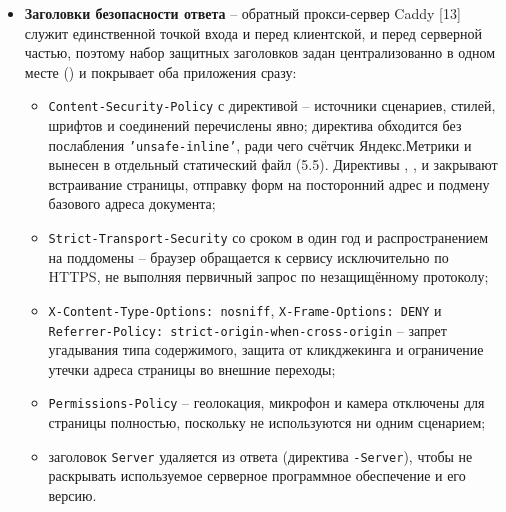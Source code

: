 \begin{itemize}
        обращаться к программному интерфейсу, задаётся явным списком в
        конфигурации сервера (механизм CORS) и не допускает произвольного
        происхождения запроса.
  \item \textbf{Заголовки безопасности ответа} -- обратный прокси-сервер
        Caddy [13] служит единственной точкой входа и перед клиентской, и
        перед серверной частью, поэтому набор защитных заголовков задан
        централизованно в одном месте () и покрывает
        оба приложения сразу:
        \begin{itemize}
          \item \texttt{Content-Security-Policy} с директивой
                 -- источники сценариев,
                стилей, шрифтов и соединений перечислены явно; директива
                 обходится без послабления
                \texttt{'unsafe-inline'}, ради чего счётчик
                Яндекс.Метрики и вынесен в отдельный статический файл
                (5.5). Директивы ,
                ,  и
                 закрывают встраивание
                страницы, отправку форм на посторонний адрес и подмену
                базового адреса документа;
          \item \texttt{Strict-Transport-Security} со сроком в один год и
                распространением на поддомены -- браузер обращается к
                сервису исключительно по HTTPS, не выполняя первичный
                запрос по незащищённому протоколу;
          \item \texttt{X-Content-Type-Options: nosniff},
                \texttt{X-Frame-Options: DENY} и
                \texttt{Referrer-Policy: strict-origin-when-cross-origin}
                -- запрет угадывания типа содержимого, защита от
                кликджекинга и ограничение утечки адреса страницы во
                внешние переходы;
          \item \texttt{Permissions-Policy} -- геолокация, микрофон и
                камера отключены для страницы полностью, поскольку не
                используются ни одним сценарием;
          \item заголовок \texttt{Server} удаляется из ответа
                (директива \texttt{-Server}), чтобы не раскрывать
                используемое серверное программное обеспечение и его
                версию.
        \end{itemize}
\end{itemize}

